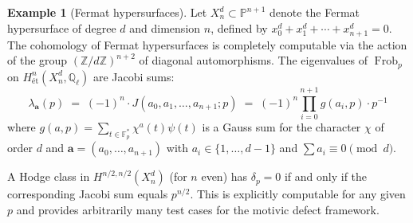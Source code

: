 \documentclass[11pt]{article}
\theoremstyle{definition}
\newtheorem{example}[theorem]{Example}
\DeclareMathOperator{\Frob}{Frob}
\begin{document}
\begin{example}[Fermat hypersurfaces]
\label{ex:fermat}
Let $X_n^d \subset \mathbb{P}^{n+1}$ denote the Fermat hypersurface of
degree $d$ and dimension $n$, defined by $x_0^d + x_1^d + \cdots + x_{n+1}^d = 0$.
The cohomology of Fermat hypersurfaces is completely computable via the
action of the group $(\mathbb{Z}/d\mathbb{Z})^{n+2}$ of diagonal
automorphisms.  The eigenvalues of $\Frob_p$ on
$H^n_{\text{\'et}}(X_n^d, \mathbb{Q}_\ell)$ are Jacobi sums:
\[
  \lambda_{\mathbf{a}}(p)
  \;=\;
  (-1)^n \cdot J(a_0, a_1, \ldots, a_{n+1}; p)
  \;=\;
  (-1)^n \prod_{i=0}^{n+1} g(a_i, p)
  \cdot p^{-1}
\]
where $g(a, p) = \sum_{t \in \mathbb{F}_p^*} \chi^a(t) \psi(t)$ is a Gauss
sum for the character $\chi$ of order $d$ and $\mathbf{a} = (a_0, \ldots,
a_{n+1})$ with $a_i \in \{1, \ldots, d-1\}$ and $\sum a_i \equiv 0 \pmod{d}$.

A Hodge class in $H^{n/2, n/2}(X_n^d)$ (for $n$ even) has
$\delta_p = 0$ if and only if the corresponding Jacobi sum equals $p^{n/2}$.
This is explicitly computable for any given $p$ and provides arbitrarily
many test cases for the motivic defect framework.
\end{example}
\end{document}
